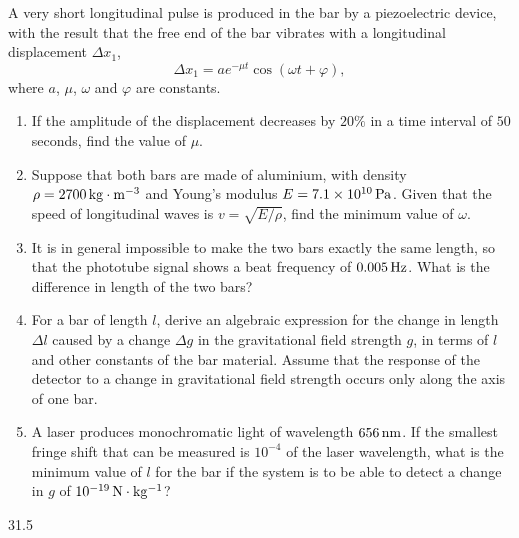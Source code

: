 A very short longitudinal pulse is produced in the bar by a piezoelectric device, with the result that the free end of the bar vibrates with a longitudinal displacement $\Delta x_1$,
\begin{equation*}
\Delta x_1=ae^{-\mu t}\cos(\omega t+\varphi),
\end{equation*}
where $a$, $\mu$, $\omega$ and $\varphi$ are constants.

\begin{enumerate}
\item[(a)] If the amplitude of the displacement decreases by $20\%$ in a time interval of $50$ seconds, find the value of $\mu$.
\item[(b)] Suppose that both bars are made of aluminium, with density $\rho=2700\,\mathrm{kg\cdot m^{-3}}$ and Young's modulus $E=7.1\times10^{10}\,\mathrm{Pa}$. Given that the speed of longitudinal waves is $v=\sqrt{E/\rho}$, find the minimum value of $\omega$.
\item[(c)] It is in general impossible to make the two bars exactly the same length, so that the phototube signal shows a beat frequency of $0.005\,\mathrm{Hz}$. What is the difference in length of the two bars?
\item[(d)] For a bar of length $l$, derive an algebraic expression for the change in length $\Delta l$ caused by a change $\Delta g$ in the gravitational field strength $g$, in terms of $l$ and other constants of the bar material. Assume that the response of the detector to a change in gravitational field strength occurs only along the axis of one bar.
\item[(e)] A laser produces monochromatic light of wavelength $656\,\mathrm{nm}$. If the smallest fringe shift that can be measured is $10^{-4}$ of the laser wavelength, what is the minimum value of $l$ for the bar if the system is to be able to detect a change in $g$ of $10^{-19}\,\mathrm{N\cdot kg^{-1}}$?
\end{enumerate}

\begin{figbox}{31.5}
\end{figbox}

